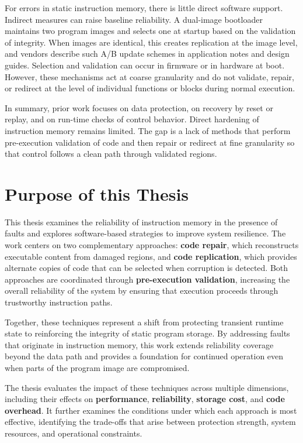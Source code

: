 For errors in static instruction memory, there is little direct software support. Indirect measures can raise baseline reliability. A dual-image bootloader maintains two program images and selects one at startup based on the validation of integrity. When images are identical, this creates replication at the image level, and vendors describe such A/B update schemes in application notes and design guides. Selection and validation can occur in firmware or in hardware at boot. However, these mechanisms act at coarse granularity and do not validate, repair, or redirect at the level of individual functions or blocks during normal execution.

In summary, prior work focuses on data protection, on recovery by reset or replay, and on run-time checks of control behavior. Direct hardening of instruction memory remains limited. The gap is a lack of methods that perform pre-execution validation of code and then repair or redirect at fine granularity so that control follows a clean path through validated regions.

\section{Purpose of this Thesis}

This thesis examines the reliability of instruction memory in the presence of faults and explores software-based strategies to improve system resilience. The work centers on two complementary approaches: \textbf{code repair}, which reconstructs executable content from damaged regions, and \textbf{code replication}, which provides alternate copies of code that can be selected when corruption is detected. Both approaches are coordinated through \textbf{pre-execution validation}, increasing the overall reliability of the system by ensuring that execution proceeds through trustworthy instruction paths.

Together, these techniques represent a shift from protecting transient runtime state to reinforcing the integrity of static program storage. By addressing faults that originate in instruction memory, this work extends reliability coverage beyond the data path and provides a foundation for continued operation even when parts of the program image are compromised.

The thesis evaluates the impact of these techniques across multiple dimensions, including their effects on \textbf{performance}, \textbf{reliability}, \textbf{storage cost}, and \textbf{code overhead}. It further examines the conditions under which each approach is most effective, identifying the trade-offs that arise between protection strength, system resources, and operational constraints.
